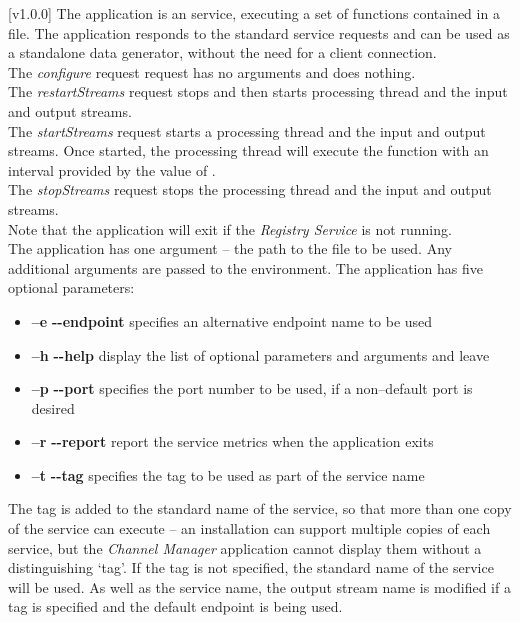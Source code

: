[v1.0.0]
The  application is an  service,
executing a set of \JS{} functions contained in a file.
The application responds to the standard  service requests and can be used
as a standalone data generator, without the need for a client connection.\\

The \emph{configure} request request has no arguments and does nothing.\\

The \emph{restartStreams} request stops and then starts processing thread and the input
and output streams.\\

The \emph{startStreams} request starts a processing thread and the input and output
streams.
Once started, the processing thread will execute the  function with
an interval provided by the value of .\\

The \emph{stopStreams} request stops the processing thread and the input and output
streams.\\ 

Note that the application will exit if the \emph{Registry Service} is not running.\\

The application has one argument -- the path to the \JS{} file to be used.
Any additional arguments are passed to the \JS{} environment.
The application has five optional parameters:
\begin{itemize}
\item \textbf{--e} \textbar{} \textbf{{-}{-}endpoint} specifies an alternative endpoint
name to be used
\item \textbf{--h} \textbar{} \textbf{{-}{-}help} display the list of optional parameters
and arguments and leave
\item \textbf{--p} \textbar{} \textbf{{-}{-}port} specifies the port number to be used, if
a non--default port is desired
\item \textbf{--r} \textbar{} \textbf{{-}{-}report} report the service metrics when the
application exits
\item \textbf{--t} \textbar{} \textbf{{-}{-}tag} specifies the tag to be used as part of
the service name
\end{itemize}
The tag is added to the standard name of the service, so that more than one copy of the
service can execute -- an \mplusm{} installation can support multiple copies of each
 service, but the \emph{Channel Manager} application cannot display them
without a distinguishing `tag'.
If the tag is not specified, the standard name of the service will be used.
As well as the service name, the output stream name is modified if a tag is specified and
the default endpoint is being used.\\

